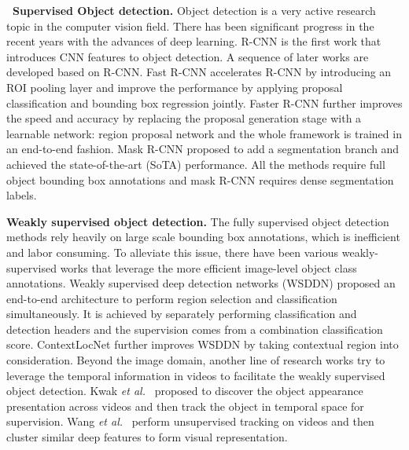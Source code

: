 \documentclass[10pt,twocolumn,letterpaper]{article}
\def\etal{\emph{et al.}}
\begin{document}
\textbf{~Supervised Object detection.}
Object detection is a very active research topic in the computer vision field. There has been significant progress in the recent years with the advances of deep learning. R-CNN \cite{girshick14CVPR} is the first work that introduces CNN features to object detection. 
A sequence of later works are developed based on R-CNN. Fast R-CNN \cite{girshick2015fast} accelerates R-CNN by introducing an ROI pooling layer and improve the performance by applying proposal classification and bounding box regression jointly. Faster R-CNN \cite{ren2015faster} further improves the speed and accuracy by replacing the proposal generation stage with a learnable network: region proposal network and the whole framework is trained in an end-to-end fashion. Mask R-CNN \cite{he2017mask} proposed to add a segmentation branch and achieved the state-of-the-art (SoTA) performance. All the methods require full object bounding box annotations and mask R-CNN requires dense segmentation labels.

\textbf{Weakly supervised object detection.}
The fully supervised object detection methods rely heavily on large scale bounding box annotations, which is inefficient and labor consuming. To alleviate this issue, there have been various weakly-supervised works \cite{cinbis2017weakly,song2014learning,bilen2016weakly,kantorov2016contextlocnet,jie2017deep,peyre2017weakly,shi2017weakly,wei2018ts2c,oh2017exploiting,bai2017multiple,singh2017hide,zhu2017soft,zhang2018zigzag,srikantha2017weak,zhou2018weakly,zhang2018w2f,diba2017weakly,shen2018weakly,wan2018min,zhang2018adversarial} that leverage the more efficient image-level object class annotations. Weakly supervised deep detection networks (WSDDN) \cite{bilen2016weakly} proposed an end-to-end architecture to perform region selection and classification simultaneously. It is achieved by separately performing classification and detection headers and the supervision comes from a combination classification score. ContextLocNet \cite{kantorov2016contextlocnet} further improves WSDDN by taking contextual region into consideration. Beyond the image domain, another line of research works \cite{kwak2015unsupervised,wang2015unsupervised} try to leverage the temporal information in videos to facilitate the weakly supervised object detection. Kwak \etal~\cite{kwak2015unsupervised}  proposed to discover the object appearance presentation across videos and then track the object in temporal space for supervision. Wang \etal~\cite{wang2015unsupervised} perform unsupervised tracking on videos and then cluster similar deep features to form visual representation.
\end{document}
